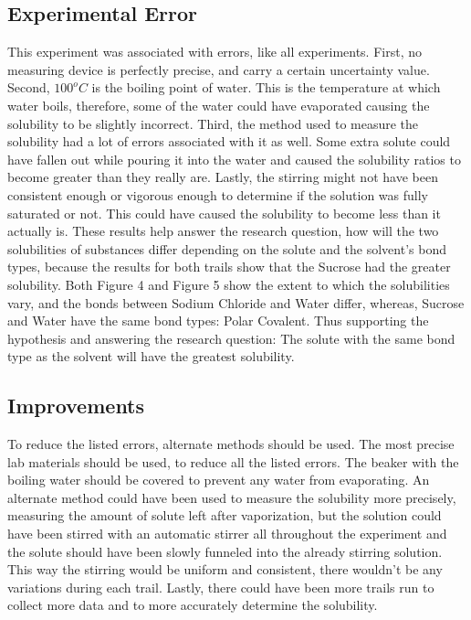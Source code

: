 \documentclass{article}
\begin{document}
\subsection*{Experimental Error}
This experiment was associated with errors, like all experiments. First, no measuring device is perfectly precise, and carry a certain uncertainty value. Second, $100^o C$ is the boiling point of water. This is the temperature at which water boils, therefore, some of the water could have evaporated causing the solubility to be slightly incorrect. Third, the method used to measure the solubility had a lot of errors associated with it as well. Some extra solute could have fallen out while pouring it into the water and caused the solubility ratios to become greater than they really are. Lastly, the stirring might not have been consistent enough or vigorous enough to determine if the solution was fully saturated or not. This could have caused the solubility to become less than it actually is. These results help answer the research question, how will the two solubilities of substances differ depending on the solute and the solvent's bond types, because the results for both trails show that the Sucrose had the greater solubility. Both Figure 4 and Figure 5 show the extent to which the solubilities vary, and the bonds between Sodium Chloride and Water differ, whereas, Sucrose and Water have the same bond types: Polar Covalent. Thus supporting the hypothesis and answering the research question: The solute with the same bond type as the solvent will have the greatest solubility. \\
\subsection*{Improvements}
To reduce the listed errors, alternate methods should be used. The most precise lab materials should be used, to reduce all the listed errors. The beaker with the boiling water should be covered to prevent any water from evaporating. An alternate method could have been used to measure the solubility more precisely, measuring the amount of solute left after vaporization, but the solution could have been stirred with an automatic stirrer all throughout the experiment and the solute should have been slowly funneled into the already stirring solution. This way the stirring would be uniform and consistent, there wouldn't be any variations during each trail. Lastly, there could have been more trails run to collect more data and to more accurately determine the solubility. 
\end{document}
